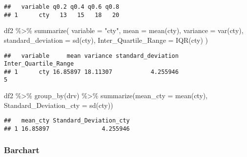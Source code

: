 \documentclass[
]{article}
\newenvironment{Shaded}{\begin{snugshade}}{\end{snugshade}}
\newcommand{\AttributeTok}[1]{\textcolor[rgb]{0.77,0.63,0.00}{#1}}
\newcommand{\FunctionTok}[1]{\textcolor[rgb]{0.00,0.00,0.00}{#1}}
\newcommand{\NormalTok}[1]{#1}
\newcommand{\SpecialCharTok}[1]{\textcolor[rgb]{0.00,0.00,0.00}{#1}}
\newcommand{\StringTok}[1]{\textcolor[rgb]{0.31,0.60,0.02}{#1}}
\begin{document}
\begin{verbatim}
##   variable q0.2 q0.4 q0.6 q0.8
## 1      cty   13   15   18   20
\end{verbatim}

\begin{Shaded}
\begin{Highlighting}[]
\NormalTok{df2 }\SpecialCharTok{\%\textgreater{}\%}
    \FunctionTok{summarize}\NormalTok{(}
      \AttributeTok{variable =} \StringTok{"cty"}\NormalTok{, }
      \AttributeTok{mean =} \FunctionTok{mean}\NormalTok{(cty), }
      \AttributeTok{variance =} \FunctionTok{var}\NormalTok{(cty),}
      \AttributeTok{standard\_deviation =} \FunctionTok{sd}\NormalTok{(cty),}
      \AttributeTok{Inter\_Quartile\_Range =} \FunctionTok{IQR}\NormalTok{(cty)}
\NormalTok{)}
\end{Highlighting}
\end{Shaded}

\begin{verbatim}
##   variable     mean variance standard_deviation Inter_Quartile_Range
## 1      cty 16.85897 18.11307           4.255946                    5
\end{verbatim}

\begin{Shaded}
\begin{Highlighting}[]
\NormalTok{df2 }\SpecialCharTok{\%\textgreater{}\%}
    \FunctionTok{group\_by}\NormalTok{(drv) }\SpecialCharTok{\%\textgreater{}\%}
    \FunctionTok{summarize}\NormalTok{(}\AttributeTok{mean\_cty =} \FunctionTok{mean}\NormalTok{(cty), }\AttributeTok{Standard\_Deviation\_cty =} \FunctionTok{sd}\NormalTok{(cty))}
\end{Highlighting}
\end{Shaded}

\begin{verbatim}
##   mean_cty Standard_Deviation_cty
## 1 16.85897               4.255946
\end{verbatim}

\hypertarget{barchart}{%
\subsubsection{Barchart}\label{barchart}}
\end{document}
